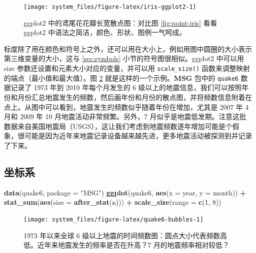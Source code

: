 \documentclass[
  b5paper,
  UTF8,twoside]{book}
\newenvironment{Shaded}{\begin{snugshade}}{\end{snugshade}}
\newcommand{\AttributeTok}[1]{\textcolor[rgb]{0.13,0.29,0.53}{#1}}
\newcommand{\DecValTok}[1]{\textcolor[rgb]{0.00,0.00,0.81}{#1}}
\newcommand{\FunctionTok}[1]{\textcolor[rgb]{0.13,0.29,0.53}{\textbf{#1}}}
\newcommand{\NormalTok}[1]{#1}
\newcommand{\SpecialCharTok}[1]{\textcolor[rgb]{0.81,0.36,0.00}{\textbf{#1}}}
\newcommand{\StringTok}[1]{\textcolor[rgb]{0.31,0.60,0.02}{#1}}
\begin{document}
\begin{figure}

{\centering \texttt{[image: system\_files/figure-latex/iris-ggplot2-1]} 

}

\caption[ggplot2 中的鸢尾花花瓣长宽散点图]{ggplot2 中的鸢尾花花瓣长宽散点图：对比图 \ref{fig:point-iris} 看看 ggplot2 中语法之简洁，颜色、形状、图例一气呵成。}\label{fig:iris-ggplot2}
\end{figure}





标度除了用在颜色和符号上之外，还可以用在大小上，例如用图中圆圈的大小表示第三维变量的大小，这与 \ref{sec:symbols} 小节的符号图很相似。ggplot2 中可以用 size 参数还设置和元素大小对应的变量，并可以用 \texttt{scale\_size()} 函数来调整映射的端点（最小值和最大值）。图 \ref{fig:quake6-bubbles} 就是这样的一个示例。\textbf{MSG} 包中的 \texttt{quake6} 数据记录了 1973 年到 2010 年每个月发生的 6 级以上的地震信息，我们可以按照年份和月份汇总地震发生的频数，然后画年份和月份的散点图，并将频数信息附着在点上。从图中可以看到，地震发生的频数似乎随着年份在增加，尤其是 2007 年 4 月和 2009 年 10 月地震活动非常频繁。另外，7 月似乎是地震低发期。注意这批数据来自美国地震局（USGS），这让我们考虑到地震频数逐年增加可能是个假象，很可能是因为近年来地震记录设备越来越先进，更多地震活动被探测到并记录了下来。

\subsection{坐标系}\label{ux5750ux6807ux7cfb}

\begin{Shaded}
\begin{Highlighting}[]
\FunctionTok{data}\NormalTok{(quake6, }\AttributeTok{package =} \StringTok{"MSG"}\NormalTok{)}
\FunctionTok{ggplot}\NormalTok{(quake6, }\FunctionTok{aes}\NormalTok{(}\AttributeTok{x =}\NormalTok{ year, }\AttributeTok{y =}\NormalTok{ month)) }\SpecialCharTok{+}
  \FunctionTok{stat\_sum}\NormalTok{(}\FunctionTok{aes}\NormalTok{(}\AttributeTok{size =} \FunctionTok{after\_stat}\NormalTok{(n))) }\SpecialCharTok{+} \FunctionTok{scale\_size}\NormalTok{(}\AttributeTok{range =} \FunctionTok{c}\NormalTok{(}\DecValTok{1}\NormalTok{, }\DecValTok{8}\NormalTok{))}
\end{Highlighting}
\end{Shaded}

\begin{figure}

{\centering \texttt{[image: system\_files/figure-latex/quake6-bubbles-1]} 

}

\caption[1973 年以来全球 6 级以上地震的时间频数图]{1973 年以来全球 6 级以上地震的时间频数图：圆点大小代表频数高低。近年来地震发生的频率是否在升高？7 月的地震频率相对较低？}\label{fig:quake6-bubbles}
\end{figure}
\end{document}
